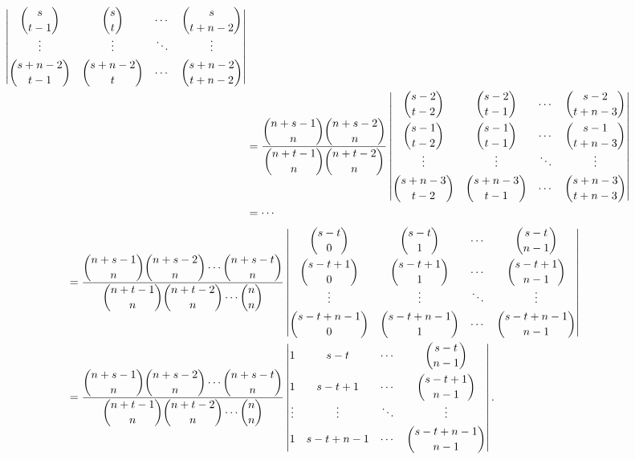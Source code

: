 \documentclass[color=black,device=normal,lang=cn,mode=geye]{elegantnote}
\begin{document}
\begin{solution}
\begin{landscape}
\begin{align*}
\begin{vmatrix}
                \dbinom{s}{t-1} & \dbinom{s}{t} & \cdots & \dbinom{s}{t+n-2} \\
                \vdots & \vdots & \ddots & \vdots \\[4pt]
                \dbinom{s+n-2}{t-1} & \dbinom{s+n-2}{t} & \cdots & \dbinom{s+n-2}{t+n-2} \\
            \end{vmatrix} \\
            & =\dfrac{\dbinom{n+s-1}{n}\dbinom{n+s-2}{n}}{\dbinom{n+t-1}{n}\dbinom{n+t-2}{n}}\begin{vmatrix}
                \dbinom{s-2}{t-2} & \dbinom{s-2}{t-1} & \cdots & \dbinom{s-2}{t+n-3} \\[10pt]
                \dbinom{s-1}{t-2} & \dbinom{s-1}{t-1} & \cdots & \dbinom{s-1}{t+n-3} \\
                \vdots & \vdots & \ddots & \vdots \\[4pt]
                \dbinom{s+n-3}{t-2} & \dbinom{s+n-3}{t-1} & \cdots & \dbinom{s+n-3}{t+n-3} \\
            \end{vmatrix} \\
            & =\cdots
        \end{align*}
        \begin{align*}
            & =\dfrac{\dbinom{n+s-1}{n}\dbinom{n+s-2}{n}\cdots\dbinom{n+s-t}{n}}{\dbinom{n+t-1}{n}\dbinom{n+t-2}{n}\cdots\dbinom{n}{n}}\begin{vmatrix}
                \dbinom{s-t}{0} & \dbinom{s-t}{1} & \cdots & \dbinom{s-t}{n-1} \\[10pt]
                \dbinom{s-t+1}{0} & \dbinom{s-t+1}{1} & \cdots & \dbinom{s-t+1}{n-1} \\
                \vdots & \vdots & \ddots & \vdots \\[4pt]
                \dbinom{s-t+n-1}{0} & \dbinom{s-t+n-1}{1} & \cdots & \dbinom{s-t+n-1}{n-1} \\
            \end{vmatrix} \\
            & =\dfrac{\dbinom{n+s-1}{n}\dbinom{n+s-2}{n}\cdots\dbinom{n+s-t}{n}}{\dbinom{n+t-1}{n}\dbinom{n+t-2}{n}\cdots\dbinom{n}{n}}\begin{vmatrix}
                1 & s-t & \cdots & \dbinom{s-t}{n-1} \\[10pt]
                1 & s-t+1 & \cdots & \dbinom{s-t+1}{n-1} \\
                \vdots & \vdots & \ddots & \vdots \\[4pt]
                1 & s-t+n-1 & \cdots & \dbinom{s-t+n-1}{n-1} \\
            \end{vmatrix}.
        \end{align*}
    \end{landscape}
    

\end{solution}
\end{document}
